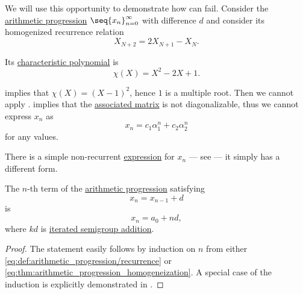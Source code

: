 \begin{example}\label{ex:arithmetic_progression_unwinding_as_recurrence}
  We will use this opportunity to demonstrate how  can fail. Consider the \hyperref[def:arithmetic_progression]{arithmetic progression} \( \seq{ x_n }_{n=0}^\infty \) with difference \( d \) and consider its homogenized recurrence relation
  \begin{equation*}
    X_{N+2} = 2 X_{N+1} - X_N.
  \end{equation*}

  Its \hyperref[def:linear_recurrence_characteristic_polynomial]{characteristic polynomial} is
  \begin{equation*}
    \chi(X) = X^2 - 2 X + 1.
  \end{equation*}

   implies that \( \chi(X) = (X - 1)^2 \), hence \( 1 \) is a multiple root. Then we cannot apply .  implies that the \hyperref[def:homogeneous_linear_recurrence_matrix]{associated matrix} is not diagonalizable, thus we cannot express \( x_n \) as
  \begin{equation*}
    x_n = c_1 \alpha_1^n + c_2 \alpha_2^n
  \end{equation*}
  for any values.

  There is a simple non-recurrent \hyperref[con:expression]{expression}  for \( x_n \) --- see  --- it simply has a different form.
\end{example}

\begin{proposition}\label{thm:arithmetic_progression_unwinding}
  The \( n \)-th term of the \hyperref[def:arithmetic_progression]{arithmetic progression} satisfying
  \begin{equation*}
    x_n = x_{n-1} + d
  \end{equation*}
  is
  \begin{equation*}
    x_n = a_0 + nd,
  \end{equation*}
  where \( kd \) is \hyperref[con:additive_semigroup/multiplication]{iterated semigroup addition}.
\end{proposition}
\begin{proof}
  The statement easily follows by induction on \( n \) from either \eqref{eq:def:arithmetic_progression/recurrence} or \eqref{eq:thm:arithmetic_progression_homogeneization}. A special case of the induction is explicitly demonstrated in .
\end{proof}

